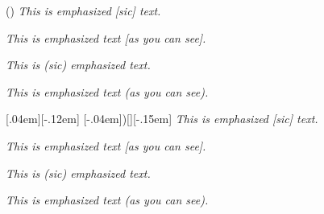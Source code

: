 \documentclass{scrartcl}
\begin{document}
\DeleteEmph[]
\DeleteEmph()
\AddEmph{[}{]}
\AddEmph{(}{)}
\emph{This is emphasized [sic] text.}

\emph{This is emphasized text [as you can see].}

\emph{This is (sic) emphasized text.}

\emph{This is emphasized text (as you can see).}

\RenewEmph{[}{]}[.04em][-.12em]
\RenewEmph{(}[-.04em]{)}[][-.15em]
\emph{This is emphasized [sic] text.}

\emph{This is emphasized text [as you can see].}

\emph{This is (sic) emphasized text.}

\emph{This is emphasized text (as you can see).}
\end{document}
